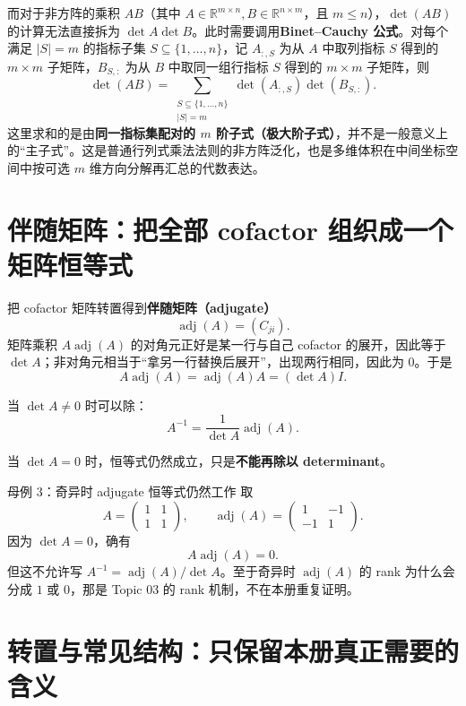 \documentclass[11pt,a4paper]{ctexart}
\newcommand{\kw}[1]{\textbf{\color{deep}#1}}
\begin{document}
而对于非方阵的乘积 $AB$（其中 $A \in \mathbb R^{m\times n}, B \in \mathbb R^{n\times m}$，且 $m \le n$），$\det(AB)$ 的计算无法直接拆为 $\det A \det B$。此时需要调用\kw{Binet--Cauchy 公式}。对每个满足 $\lvert S\rvert=m$ 的指标子集 $S\subseteq\{1,\dots,n\}$，记 $A_{:,S}$ 为从 $A$ 中取列指标 $S$ 得到的 $m\times m$ 子矩阵，$B_{S,:}$ 为从 $B$ 中取同一组行指标 $S$ 得到的 $m\times m$ 子矩阵，则
\[
\boxed{
\det(AB)
=\sum_{\substack{S\subseteq\{1,\dots,n\}\\ \lvert S\rvert=m}}
\det(A_{:,S})\det(B_{S,:}).
}
\]
这里求和的是由\kw{同一指标集配对的 $m$ 阶子式（极大阶子式）}，并不是一般意义上的“主子式”。这是普通行列式乘法法则的非方阵泛化，也是多维体积在中间坐标空间中按可选 $m$ 维方向分解再汇总的代数表达。

\section{伴随矩阵：把全部 cofactor 组织成一个矩阵恒等式}

把 cofactor 矩阵转置得到\kw{伴随矩阵（adjugate）}
\[
\operatorname{adj}(A)=(C_{ji}).
\]
矩阵乘积 $A\operatorname{adj}(A)$ 的对角元正好是某一行与自己 cofactor 的展开，因此等于 $\det A$；非对角元相当于“拿另一行替换后展开”，出现两行相同，因此为 $0$。于是
\[
\boxed{
A\operatorname{adj}(A)
=\operatorname{adj}(A)A
=(\det A)I.
}
\]

当 $\det A\neq0$ 时可以除：
\[
\boxed{A^{-1}=\frac{1}{\det A}\operatorname{adj}(A).}
\]

当 $\det A=0$ 时，恒等式仍然成立，只是\kw{不能再除以 determinant}。

\begin{examplebox}{母例 3：奇异时 adjugate 恒等式仍然工作}
取
\[
A=\begin{pmatrix}1&1\\1&1\end{pmatrix},
\qquad
\operatorname{adj}(A)=
\begin{pmatrix}1&-1\\-1&1\end{pmatrix}.
\]
因为 $\det A=0$，确有
\[
A\operatorname{adj}(A)=0.
\]
但这不允许写 $A^{-1}=\operatorname{adj}(A)/\det A$。至于奇异时 $\operatorname{adj}(A)$ 的 rank 为什么会分成 $1$ 或 $0$，那是 Topic 03 的 rank 机制，不在本册重复证明。
\end{examplebox}

\section{转置与常见结构：只保留本册真正需要的含义}
\end{document}
